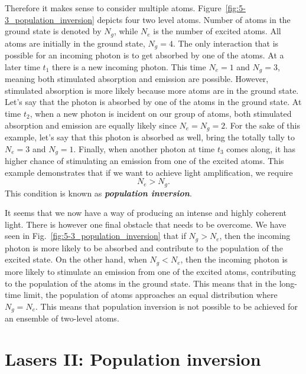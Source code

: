 Therefore it makes sense to consider multiple atoms.
Figure~\ref{fig:5-3_population_inversion} depicts four two level atoms.
Number of atoms in the ground state is denoted by $N_g$, while $N_e$ is the number of excited atoms.
All atoms are initially in the ground state, $N_g=4$.
The only interaction that is possible for an incoming photon is to get absorbed by one of the atoms.
At a later time $t_1$ there is a new incoming photon.
This time $N_e=1$ and $N_g=3$, meaning both stimulated absorption and emission are possible.
However, stimulated absorption is more likely because more atoms are in the ground state.
Let's say that the photon is absorbed by one of the atoms in the ground state.
At time $t_2$, when a new photon is incident on our group of atoms, both stimulated absorption and emission are equally likely since $N_e=N_g=2$.
For the sake of this example, let's say that this photon is absorbed as well, bring the totally tally to $N_e=3$ and $N_g=1$.
Finally, when another photon at time $t_3$ comes along, it has higher chance of stimulating an emission from one of the excited atoms.
This example demonstrates that if we want to achieve light amplification, we require
\begin{equation}
    N_e > N_g.
\end{equation}
This condition is known as \textit{\textbf{population inversion}}.

It seems that we now have a way of producing an intense and highly coherent light.
There is however one final obstacle that needs to be overcome.
We have seen in Fig.~\ref{fig:5-3_population_inversion} that if $N_g > N_e$, then the incoming photon is more likely to be absorbed and contribute to the population of the excited state.
On the other hand, when $N_g < N_e$, then the incoming photon is more likely to stimulate an emission from one of the excited atoms, contributing to the population of the atoms in the ground state.
This means that in the long-time limit, the population of atoms approaches an equal distribution where $N_g = N_e$.
This means that population inversion is not possible to be achieved for an ensemble of two-level atoms.



\section{Lasers II: Population inversion}
\label{sec:5-4_lasers2}


